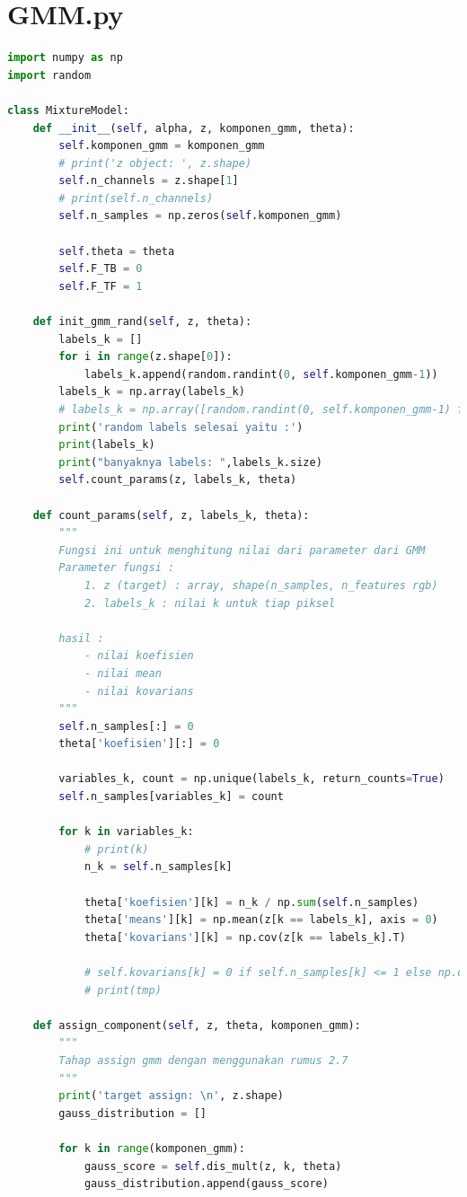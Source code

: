\section{GMM.py}
\begin{lstlisting}[language=Python, basicstyle=\tiny]
import numpy as np
import random

class MixtureModel:
	def __init__(self, alpha, z, komponen_gmm, theta):
		self.komponen_gmm = komponen_gmm
		# print('z object: ', z.shape)
		self.n_channels = z.shape[1]
		# print(self.n_channels)
		self.n_samples = np.zeros(self.komponen_gmm)

		self.theta = theta
		self.F_TB = 0
		self.F_TF = 1

	def init_gmm_rand(self, z, theta):
		labels_k = []
		for i in range(z.shape[0]):
			labels_k.append(random.randint(0, self.komponen_gmm-1))
		labels_k = np.array(labels_k)
		# labels_k = np.array([random.randint(0, self.komponen_gmm-1) for i in range(z.shape[0])])
		print('random labels selesai yaitu :')
		print(labels_k)
		print("banyaknya labels: ",labels_k.size)
		self.count_params(z, labels_k, theta)

	def count_params(self, z, labels_k, theta):
		"""
		Fungsi ini untuk menghitung nilai dari parameter dari GMM
		Parameter fungsi :
			1. z (target) : array, shape(n_samples, n_features rgb)
			2. labels_k : nilai k untuk tiap piksel

		hasil :
			- nilai koefisien
			- nilai mean
			- nilai kovarians
		"""
		self.n_samples[:] = 0
		theta['koefisien'][:] = 0   

		variables_k, count = np.unique(labels_k, return_counts=True)
		self.n_samples[variables_k] = count

		for k in variables_k:
			# print(k)
			n_k = self.n_samples[k]

			theta['koefisien'][k] = n_k / np.sum(self.n_samples)
			theta['means'][k] = np.mean(z[k == labels_k], axis = 0)
			theta['kovarians'][k] = np.cov(z[k == labels_k].T) 

			# self.kovarians[k] = 0 if self.n_samples[k] <= 1 else np.cov(target[k == labels_k].T)
			# print(tmp)

	def assign_component(self, z, theta, komponen_gmm):
		"""
		Tahap assign gmm dengan menggunakan rumus 2.7
		"""
		print('target assign: \n', z.shape)
		gauss_distribution = []

		for k in range(komponen_gmm):
			gauss_score = self.dis_mult(z, k, theta)
			gauss_distribution.append(gauss_score)


\end{lstlisting}
